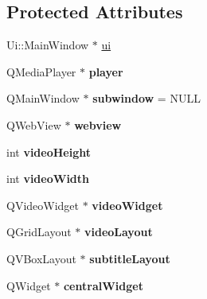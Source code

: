 \subsection*{Protected Attributes}
\begin{DoxyCompactItemize}
\item 
Ui\+::\+Main\+Window $\ast$ \hyperlink{classMainWindow_a35466a70ed47252a0191168126a352a5}{ui}
\item 
\hypertarget{classMainWindow_af3f32d4111cefe576b4789f3611e99e8}{}Q\+Media\+Player $\ast$ {\bfseries player}\label{classMainWindow_af3f32d4111cefe576b4789f3611e99e8}

\item 
\hypertarget{classMainWindow_a063e8029e7ce646ef1bcdf84beb4157a}{}Q\+Main\+Window $\ast$ {\bfseries subwindow} = N\+U\+L\+L\label{classMainWindow_a063e8029e7ce646ef1bcdf84beb4157a}

\item 
\hypertarget{classMainWindow_a1673c9d0d60ad3586c8c64ab215b6089}{}Q\+Web\+View $\ast$ {\bfseries webview}\label{classMainWindow_a1673c9d0d60ad3586c8c64ab215b6089}

\item 
\hypertarget{classMainWindow_a3d44e16270b2e68a86399911f2704c10}{}int {\bfseries video\+Height}\label{classMainWindow_a3d44e16270b2e68a86399911f2704c10}

\item 
\hypertarget{classMainWindow_ae53e754f06ce9bc859e44e48d717454e}{}int {\bfseries video\+Width}\label{classMainWindow_ae53e754f06ce9bc859e44e48d717454e}

\item 
\hypertarget{classMainWindow_a864558ff87b64a491d601b9b2e31df0b}{}Q\+Video\+Widget $\ast$ {\bfseries video\+Widget}\label{classMainWindow_a864558ff87b64a491d601b9b2e31df0b}

\item 
\hypertarget{classMainWindow_a8d0199acb41711efb652ffeb569da73e}{}Q\+Grid\+Layout $\ast$ {\bfseries video\+Layout}\label{classMainWindow_a8d0199acb41711efb652ffeb569da73e}

\item 
\hypertarget{classMainWindow_a78fa3441fc4a50be4308d1184f86b7b3}{}Q\+V\+Box\+Layout $\ast$ {\bfseries subtitle\+Layout}\label{classMainWindow_a78fa3441fc4a50be4308d1184f86b7b3}

\item 
\hypertarget{classMainWindow_ad3bde47a75b6c59146d6aff1752d077f}{}Q\+Widget $\ast$ {\bfseries central\+Widget}\label{classMainWindow_ad3bde47a75b6c59146d6aff1752d077f}


\end{DoxyCompactItemize}
